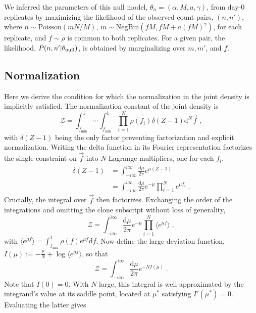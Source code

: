 \documentclass[letterpaper,english,prl,reprint,longbibliography]{revtex4-1} %
\begin{document}
We inferred the parameters of this null model, $\theta_n=(\alpha,M,a,\gamma)$, from day-0 replicates by maximizing the likelihood of the observed count pairs, $(n,n')$, where $n\sim \mathrm{Poisson}(m N/M)$, $m\sim \mathrm{NegBin}(fM,fM+a (fM)^{\gamma})$, for each replicate, and $f\sim\rho$ is common to both replicates. For a given pair, the likelihood, $P(n,n'|\theta_{\textrm{\textrm{null}}})$, is obtained by marginalizing over $m,m'$, and $f$.

\subsection*{Normalization}
Here we derive the condition for which the normalization in the joint density is implicitly satisfied. The normalization constant of the joint density is
\begin{equation}
	\mathcal{Z}=\int_{f_\textrm{min}}^1\cdots\int_{f_\textrm{min}}^1\prod_{i=1}^N \rho(f_i)\delta(Z-1)\textrm{d}^N\vec{f} \;,
\end{equation}
with $\delta(Z-1)$ being the only factor preventing factorization and explicit normalization. Writing the delta function in its Fourier representation factorizes the single constraint on $\vec{f}$ into $N$ Lagrange multipliers, one for each $f_i$,
\begin{align}
	\delta(Z-1)&=\int_{-i\infty}^{i\infty} \frac{\textrm{d} \mu}{2 \pi}e^{\mu(Z-1)}  \\
	&=\int_{-i\infty}^{i\infty} \frac{\textrm{d} \mu}{2 \pi}e^{-\mu}\prod_{i=1}^N e^{\mu f_i} \;.
\end{align}
Crucially, the integral over $\vec{f}$ then factorizes. Exchanging the order of the integrations and omitting the clone subscript without loss of generality,
\begin{equation}
	\mathcal{Z}=\int_{-i\infty}^{i\infty} \frac{\textrm{d} \mu}{2 \pi} e^{-\mu} \prod_{i=1}^N \langle e^{\mu f}\rangle\;,\label{eq:bigZ}
\end{equation}
with $\langle e^{\mu f}\rangle=\int_{f_\textrm{min}}^1\rho(f)e^{\mu f}\textrm{d}f$. Now define the large deviation function, $I(\mu):=-\frac{\mu}{N}+\log \langle e^{\mu f}\rangle$, so that 
\begin{equation}
	\mathcal{Z}=\int_{-i\infty}^{i\infty} \frac{\textrm{d} \mu}{2 \pi} e^{-N I(\mu)}\;.\label{eq:largedev}
\end{equation}
Note that $I(0)=0$. With $N$ large, this integral is well-approximated by the integrand's value at its saddle point, located at $\mu^*$ satisfying $I'(\mu^*)=0$.  Evaluating the latter gives
\end{document}
